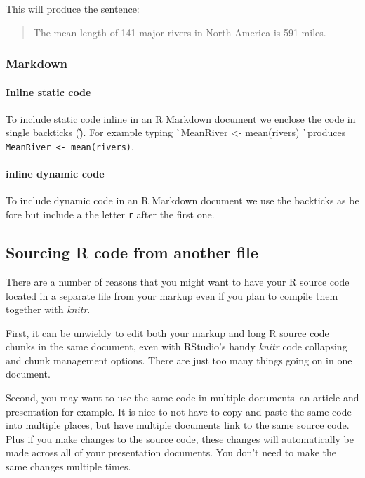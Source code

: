 \documentclass[ChapterTOCs,krantz1]{krantz}\usepackage{graphicx, color}
\begin{document}
\noindent This will produce the sentence:

\begin{quote}
    The mean length of 141 major rivers in North America is 591 miles. 
\end{quote}

\subsubsection{Markdown}

\paragraph{Inline static code}

To include static code inline in an R Markdown document we enclose the code in single backticks (\` \`). For example typing \`\ MeanRiver \textless- mean(rivers) \`\ produces {\tt{MeanRiver \textless- mean(rivers)}}.

\paragraph{inline dynamic code}

To include dynamic code in an R Markdown document we use the backticks as be fore but include a the letter \texttt{r} after the first one.

\subsection{Sourcing R code from another file}

There are a number of reasons that you might want to have your R source code located in a separate file from your markup even if you plan to compile them together with \emph{knitr}.

First, it can be unwieldy to edit both your markup and long R source code chunks in the same document, even with RStudio's handy \emph{knitr} code collapsing and chunk management options. There are just too many things going on in one document.

Second, you may want to use the same code in multiple documents--an
article and presentation for example. It is nice to not have to copy and
paste the same code into multiple places, but have multiple documents
link to the same source code. Plus if you make changes to the source
code, these changes will automatically be made across all of your
presentation documents. You don't need to make the same changes multiple
times.
\end{document}
